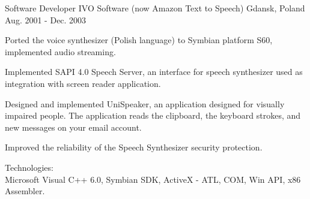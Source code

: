 \begin{cventries}
\cventry
{Software Developer} %
{IVO Software (now Amazon Text to Speech)} %
{Gdansk, Poland} %
{Aug. 2001 - Dec. 2003} %
{
  \begin{cvitems} %
    \item
    {
      Ported the voice synthesizer (Polish language) to Symbian platform S60, implemented audio streaming.
    }
    \item
    {
      Implemented SAPI 4.0 Speech Server, an interface for speech synthesizer used as integration with screen reader application.
    }
    \item
    {
      Designed and implemented UniSpeaker, an application designed for visually impaired people.
      The application reads the clipboard, the keyboard strokes, and new messages on your email account.
    }
    \item
    {
      Improved the reliability of the Speech Synthesizer security protection.
    }
    \item
    {
      Technologies:\\
      Microsoft Visual C++ 6.0, Symbian SDK, ActiveX - ATL, COM, Win API, x86 Assembler.
    }
  \end{cvitems}
}

\end{cventries}
